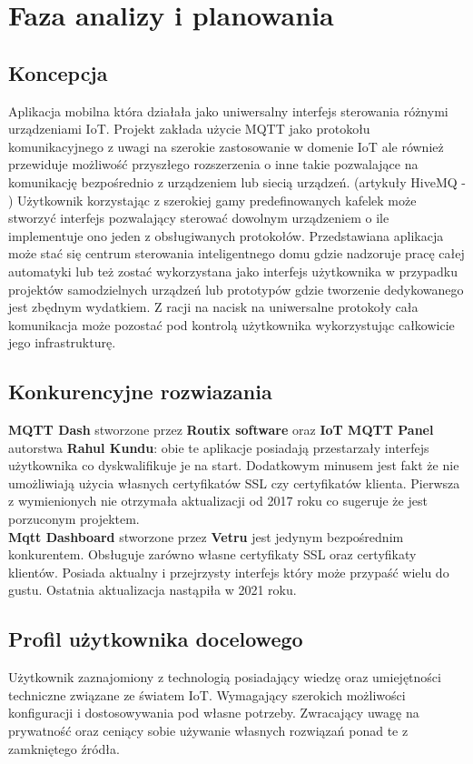 \section{Faza analizy i planowania}

\subsection{Koncepcja}
Aplikacja mobilna która działała jako uniwersalny interfejs sterowania różnymi urządzeniami IoT. Projekt zakłada użycie MQTT jako protokołu komunikacyjnego z uwagi na szerokie zastosowanie w domenie IoT ale również przewiduje możliwość przyszłego rozszerzenia o inne takie pozwalające na komunikację bezpośrednio z urządzeniem lub siecią urządzeń. (artykuły HiveMQ - \cite{mqttincreasedadoption}\cite{mqttadoptionishigh}) Użytkownik korzystając z szerokiej gamy predefinowanych kafelek może stworzyć interfejs pozwalający sterować dowolnym urządzeniem o ile implementuje ono jeden z obsługiwanych protokołów. Przedstawiana aplikacja może stać się centrum sterowania inteligentnego domu gdzie nadzoruje pracę całej automatyki lub też zostać wykorzystana jako interfejs użytkownika w przypadku projektów samodzielnych urządzeń lub prototypów gdzie tworzenie dedykowanego jest zbędnym wydatkiem. Z racji na nacisk na uniwersalne protokoły cała komunikacja może pozostać pod kontrolą użytkownika wykorzystując całkowicie jego infrastrukturę.

\subsection{Konkurencyjne rozwiazania}

\textbf{MQTT Dash} stworzone przez \textbf{Routix software} oraz \textbf{IoT MQTT Panel} autorstwa \textbf{Rahul Kundu}: obie te aplikacje posiadają przestarzały interfejs użytkownika co dyskwalifikuje je na start. Dodatkowym minusem jest fakt że nie umożliwiają użycia własnych certyfikatów SSL czy certyfikatów klienta. Pierwsza z wymienionych nie otrzymała aktualizacji od 2017 roku co sugeruje że jest porzuconym projektem.\\

\textbf{Mqtt Dashboard} stworzone przez \textbf{Vetru} jest jedynym bezpośrednim konkurentem. Obsługuje zarówno własne certyfikaty SSL oraz certyfikaty klientów. Posiada aktualny i przejrzysty interfejs który może przypaść wielu do gustu. Ostatnia aktualizacja nastąpiła w 2021 roku.

\subsection{Profil użytkownika docelowego}
Użytkownik zaznajomiony z technologią posiadający wiedzę oraz umiejętności techniczne związane ze światem IoT. Wymagający szerokich możliwości konfiguracji i dostosowywania pod własne potrzeby. Zwracający uwagę na prywatność oraz ceniący sobie używanie własnych rozwiązań ponad te z zamkniętego źródła.

